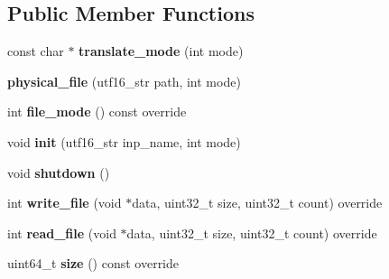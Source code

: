 \subsection*{Public Member Functions}
\begin{DoxyCompactItemize}
\item 
\mbox{\label{structeka2l1_1_1physical__file_a09fdad055fdd36cfea064b5fcc2656c0}} 
const char $\ast$ {\bfseries translate\+\_\+mode} (int mode)
\item 
\mbox{\label{structeka2l1_1_1physical__file_aeaaf519a02aee0a5edb9675a48241599}} 
{\bfseries physical\+\_\+file} (utf16\+\_\+str path, int mode)
\item 
\mbox{\label{structeka2l1_1_1physical__file_a2e6568a263caa270212ce38ef8377997}} 
int {\bfseries file\+\_\+mode} () const override
\item 
\mbox{\label{structeka2l1_1_1physical__file_ad836c39d98df557f6c1c1fce768718a1}} 
void {\bfseries init} (utf16\+\_\+str inp\+\_\+name, int mode)
\item 
\mbox{\label{structeka2l1_1_1physical__file_aa04e2ac89140ff6a431e190cc102f8fa}} 
void {\bfseries shutdown} ()
\item 
\mbox{\label{structeka2l1_1_1physical__file_aa416267d0da80371273db3b47f87cb71}} 
int {\bfseries write\+\_\+file} (void $\ast$data, uint32\+\_\+t size, uint32\+\_\+t count) override
\item 
\mbox{\label{structeka2l1_1_1physical__file_a6e01a1ec4ad45771d87a2da8c69bb27b}} 
int {\bfseries read\+\_\+file} (void $\ast$data, uint32\+\_\+t size, uint32\+\_\+t count) override
\item 
\mbox{\label{structeka2l1_1_1physical__file_a6c7939ce580de658967c50a70538d5ed}} 
uint64\+\_\+t {\bfseries size} () const override
\item 
\mbox{\label{structeka2l1_1_1physical__file_ad4d027f025d449e16c25340e8a73bd1e}} 

\end{DoxyCompactItemize}
